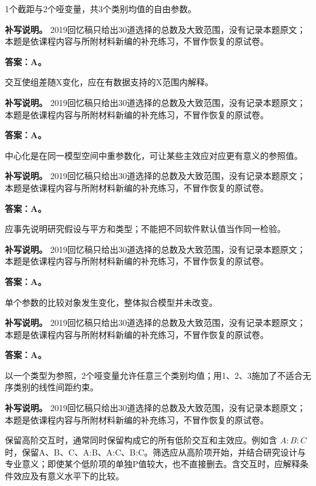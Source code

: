 1个截距与2个哑变量，共3个类别均值的自由参数。


\textbf{补写说明。} 2019回忆稿只给出30道选择的总数及大致范围，没有记录本题原文；本题是依课程内容与所附材料新编的补充练习，不冒作恢复的原试卷。



\textbf{答案：A。}

交互使组差随X变化，应在有数据支持的X范围内解释。


\textbf{补写说明。} 2019回忆稿只给出30道选择的总数及大致范围，没有记录本题原文；本题是依课程内容与所附材料新编的补充练习，不冒作恢复的原试卷。



\textbf{答案：A。}

中心化是在同一模型空间中重参数化，可让某些主效应对应更有意义的参照值。


\textbf{补写说明。} 2019回忆稿只给出30道选择的总数及大致范围，没有记录本题原文；本题是依课程内容与所附材料新编的补充练习，不冒作恢复的原试卷。



\textbf{答案：A。}

应事先说明研究假设与平方和类型；不能把不同软件默认值当作同一检验。


\textbf{补写说明。} 2019回忆稿只给出30道选择的总数及大致范围，没有记录本题原文；本题是依课程内容与所附材料新编的补充练习，不冒作恢复的原试卷。



\textbf{答案：A。}

单个参数的比较对象发生变化，整体拟合模型并未改变。


\textbf{补写说明。} 2019回忆稿只给出30道选择的总数及大致范围，没有记录本题原文；本题是依课程内容与所附材料新编的补充练习，不冒作恢复的原试卷。



\textbf{答案：A。}

以一个类型为参照，2个哑变量允许任意三个类别均值；用1、2、3施加了不适合无序类别的线性间距约束。


\textbf{补写说明。} 2019回忆稿只给出30道选择的总数及大致范围，没有记录本题原文；本题是依课程内容与所附材料新编的补充练习，不冒作恢复的原试卷。



保留高阶交互时，通常同时保留构成它的所有低阶交互和主效应。例如含 \(A:B:C\) 时，保留A、B、C、A:B、A:C、B:C。筛选应从高阶项开始，并结合研究设计与专业意义；即使某个低阶项的单独P值较大，也不直接删去。含交互时，应解释条件效应及有意义水平下的比较。


